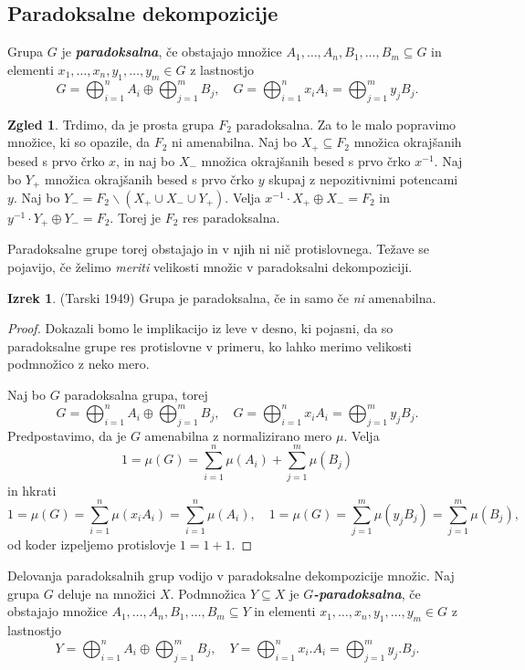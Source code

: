 \documentclass[11pt]{book}
\def\definicija{\color{rdeca}\bf\em}
\def\literatura{\color{modra}}
\theoremstyle{definition}
\theoremstyle{zgled}
\newtheorem*{zgled}{Zgled}
\theoremstyle{odprtproblem}
\theoremstyle{domacanaloga}
\newenvironment{dokaz}
    {\color{siva}\begin{proof}}
    {\end{proof}}
\theoremstyle{izrek}
\newtheorem*{izrek}{Izrek}
\begin{document}
\subsection{Paradoksalne dekompozicije}

Grupa $G$ je {\definicija paradoksalna}, če obstajajo množice $A_1, \dots, A_n, B_1, \dots, B_m \subseteq G$ in elementi $x_1, \dots, x_n, y_1, \dots, y_m \in G$ z lastnostjo
\[
G = \bigoplus_{i=1}^n A_i \oplus \bigoplus_{j = 1}^m B_j, \quad 
G = \bigoplus_{i=1}^n x_i A_i = \bigoplus_{j = 1}^m y_j B_j.
\]

\begin{zgled}
Trdimo, da je prosta grupa $F_2$ paradoksalna. Za to le malo popravimo množice, ki so opazile, da $F_2$ ni amenabilna. Naj bo $X_+ \subseteq F_2$ množica okrajšanih besed s prvo črko $x$, in naj bo $X_-$ množica okrajšanih besed s prvo črko $x^{-1}$. Naj bo $Y_+$ množica okrajšanih besed s prvo črko $y$ skupaj z nepozitivnimi potencami $y$. Naj bo $Y_- = F_2 \backslash (X_+ \cup X_- \cup Y_+)$. Velja $x^{-1}\cdot X_+ \oplus X_- = F_2$ in $y^{-1} \cdot Y_+ \oplus Y_- = F_2$. Torej je $F_2$ res paradoksalna.
\end{zgled}

Paradoksalne grupe torej obstajajo in v njih ni nič protislovnega. Težave se pojavijo, če želimo {\em meriti} velikosti množic v paradoksalni dekompoziciji.

\begin{izrek}{\literatura (Tarski 1949)}
Grupa je paradoksalna, če in samo če {\em ni} amenabilna.
\end{izrek}

\begin{dokaz}
Dokazali bomo le implikacijo iz leve v desno, ki pojasni, da so paradoksalne grupe res protislovne v primeru, ko lahko merimo velikosti podmnožico z neko mero.

Naj bo $G$ paradoksalna grupa, torej
\[
G = \bigoplus_{i=1}^n A_i \oplus \bigoplus_{j = 1}^m B_j, \quad 
G = \bigoplus_{i=1}^n x_i A_i = \bigoplus_{j = 1}^m y_j B_j.
\]
Predpostavimo, da je $G$ amenabilna z normalizirano mero $\mu$. Velja
\[
1 = \mu(G) = \sum_{i = 1}^n \mu(A_i) + \sum_{j = 1}^m \mu(B_j)
\]
in hkrati
\[
1 = \mu(G) = \sum_{i = 1}^n \mu(x_i A_i) = \sum_{i = 1}^n \mu(A_i),
\quad
1 = \mu(G) =  \sum_{j = 1}^m \mu(y_j B_j) = \sum_{j = 1}^m \mu(B_j),
\]
od koder izpeljemo protislovje $1 = 1+1$.
\end{dokaz}

Delovanja paradoksalnih grup vodijo v paradoksalne dekompozicije množic. Naj grupa $G$ deluje na množici $X$. Podmnožica $Y \subseteq X$ je {\definicija $G$-paradoksalna}, če obstajajo množice $A_1, \dots, A_n, B_1, \dots, B_m \subseteq Y$ in elementi $x_1, \dots, x_n, y_1, \dots, y_m \in G$ z lastnostjo
\[
Y = \bigoplus_{i=1}^n A_i \oplus \bigoplus_{j = 1}^m B_j, \quad 
Y = \bigoplus_{i=1}^n x_i.A_i = \bigoplus_{j = 1}^m y_j.B_j.
\]
\end{document}
